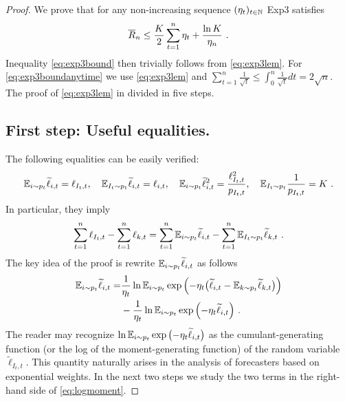 \begin{proof}
We prove that for any non-increasing sequence $(\eta_t)_{t \in \mathbb{N}}$ Exp3 satisfies
\begin{equation} \label{eq:exp3lem}
\overline{R}_n \leq \frac{K}{2} \sum_{t=1}^n \eta_t + \frac{\ln K}{\eta_n}~.
\end{equation}
%
Inequality \eqref{eq:exp3bound} then trivially follows from \eqref{eq:exp3lem}. For \eqref{eq:exp3boundanytime} we use \eqref{eq:exp3lem} and
$\sum_{t=1}^n \frac{1}{\sqrt{t}} \leq \int_{0}^n \frac{1}{\sqrt{t}} dt = 2 \sqrt{n}$. The proof of \eqref{eq:exp3lem} in divided in five steps.

\subsection*{First step: Useful equalities.}
%
The following equalities can be easily verified:
\begin{equation} \label{eq:equalities}
\mathbb{E}_{i \sim p_t} \widetilde{\ell}_{i,t} = \ell_{I_t,t}, \quad \mathbb{E}_{I_t \sim p_t} \widetilde{\ell}_{i,t} = \ell_{i,t}, \quad
\mathbb{E}_{i \sim p_t} {\widetilde{\ell}}^2_{i,t} = \frac{\ell_{I_t,t}^2}{p_{I_t,t}}, \quad \mathbb{E}_{I_t \sim p_t} \frac{1}{p_{I_t,t}} = K~.
\end{equation}
In particular, they imply
\begin{equation} \label{eq:expregret}
\sum_{t=1}^n \ell_{I_t,t} - \sum_{t=1}^n \ell_{k,t}  = \sum_{t=1}^n \mathbb{E}_{i \sim p_t} \widetilde{\ell}_{i,t} - \sum_{t=1}^n \mathbb{E}_{I_t \sim p_t} \widetilde{\ell}_{k,t}~.
\end{equation}
The key idea of the proof is rewrite $\mathbb{E}_{i \sim p_t} \widetilde{\ell}_{i,t}$ as follows 
\begin{align} 
 \mathbb{E}_{i \sim p_t} \widetilde{\ell}_{i,t} = & \frac{1}{\eta_t} \ln \mathbb{E}_{i \sim p_t} \exp{\left(- \eta_t \bigl(\widetilde{\ell}_{i,t}  - \mathbb{E}_{k \sim p_t} \widetilde{\ell}_{k,t}\bigr) \right)}  \notag \\
&- \frac{1}{\eta_t} \ln \mathbb{E}_{i \sim p_t} \exp{\left(- \eta_t \widetilde{\ell}_{i,t} \right)}~. \label{eq:logmoment}
\end{align}
The reader may recognize $\ln \mathbb{E}_{i \sim p_t} \exp{\bigl(- \eta_t \widetilde{\ell}_{i,t} \bigr)}$ as the cumulant-generating function (or the log of the moment-generating function) of the random variable $\tilde{\ell}_{I_t,t}$. This quantity naturally arises in the analysis of forecasters based on exponential weights. In the next two steps we study the two terms in the right-hand side of \eqref{eq:logmoment}.


\end{proof}

